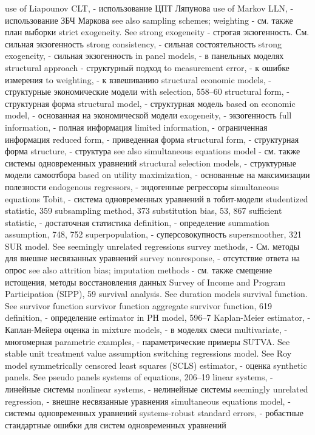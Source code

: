 use of Liapounov CLT, - использование ЦПТ Ляпунова
use of Markov LLN, - использование ЗБЧ Маркова
see also sampling schemes; weighting - см. также план выборки
strict exogeneity. See strong exogeneity  - строгая экзогенность. См. сильная экзогенность
strong consistency, - сильная состоятельность
strong exogeneity, - сильная экзогенность
in panel models, - в панельных моделях 
structural approach - структурный подход 
to measurement error, - к ошибке измерения
to weighting, - к взвешиванию
structural economic models, - структурные экономические модели
with selection, 558–60 
structural form, - структурная форма
structural model, - структурная модель 
based on economic model, - основанная на экономической модели
exogeneity, - экзогенность
full information, - полная информация
limited information, - ограниченная информация
reduced form, - приведенная форма 
structural form, - структурная форма
structure, - структура
see also simultaneous equations model - см. также системы одновременных уравнений
structural selection models, - структурные модели самоотбора
based on utility maximization, - основанные на максимизации полезности
endogenous regressors, - эндогенные регрессоры
simultaneous equations Tobit, - система одновременных уравнений в тобит-модели
studentized statistic, 359 subsampling method, 373 substitution bias, 53, 867
sufficient statistic, - достаточная статистика
definition, - определение
summation assumption, 748, 752 
superpopulation, - суперсовокупность
supersmoother, 321
SUR model. See seemingly unrelated regressions survey methods, - См. методы для внешне несвязанных уравнений
survey nonresponse, - отсутствие ответа на опрос
see also attrition bias; imputation methods - см. также смещение истощения, методы восстановления данных
Survey of Income and Program Participation (SIPP),
59
survival analysis. See duration models survival function. See survivor function survivor function
aggregate survivor function, 619 
definition, - определение
estimator in PH model, 596–7
Kaplan-Meier estimator, - Каплан-Мейера оценка
in mixture models, - в моделях смеси
multivariate, - многомерная
parametric examples, - параметрические примеры
SUTVA. See stable unit treatment value assumption switching regressions model. See Roy model symmetrically censored least squares (SCLS)
estimator, - оценка
synthetic panels. See pseudo panels systems of equations, 206–19
linear systems, - линейные системы
nonlinear systems, - нелинейные системы
seemingly unrelated regression, - внешне несвязанные уравнения
simultaneous equations model, - системы одновременных уравнений
systems-robust standard errors, - робастные стандартные ошибки для систем одновременных уравнений
